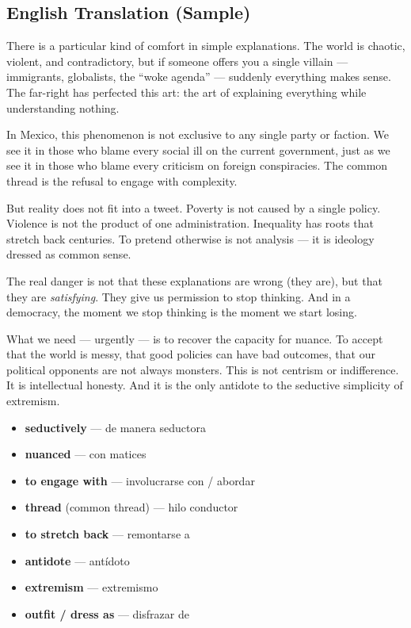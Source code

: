 \documentclass[11pt,a4paper]{article}
\begin{document}
\subsection{English Translation (Sample)}

\begin{tcolorbox}[colback=green!5!white, colframe=green!50!black, 
    title=\textbf{Translation: ``The Far-Right That Explains Everything 
    (Except Reality)''}]

There is a particular kind of comfort in simple explanations. The world is chaotic, 
violent, and contradictory, but if someone offers you a single villain --- 
immigrants, globalists, the ``woke agenda'' --- suddenly everything makes sense. 
The far-right has perfected this art: the art of explaining everything while 
understanding nothing.

In Mexico, this phenomenon is not exclusive to any single party or faction. 
We see it in those who blame every social ill on the current government, 
just as we see it in those who blame every criticism on foreign conspiracies. 
The common thread is the refusal to engage with complexity.

But reality does not fit into a tweet. Poverty is not caused by a single policy. 
Violence is not the product of one administration. Inequality has roots that stretch 
back centuries. To pretend otherwise is not analysis --- it is ideology dressed 
as common sense.

The real danger is not that these explanations are wrong (they are), but that 
they are \emph{satisfying}. They give us permission to stop thinking. And in a 
democracy, the moment we stop thinking is the moment we start losing.

What we need --- urgently --- is to recover the capacity for nuance. To accept 
that the world is messy, that good policies can have bad outcomes, that our 
political opponents are not always monsters. This is not centrism or indifference. 
It is intellectual honesty. And it is the only antidote to the seductive simplicity 
of extremism.
\end{tcolorbox}

\begin{tcolorbox}[colback=yellow!10!white, colframe=orange!70!black, 
    title=\textbf{Vocabulary Highlights for TOEFL}]
\begin{itemize}
    \item \textbf{seductively} --- de manera seductora
    \item \textbf{nuanced} --- con matices
    \item \textbf{to engage with} --- involucrarse con / abordar
    \item \textbf{thread} (common thread) --- hilo conductor
    \item \textbf{to stretch back} --- remontarse a
    \item \textbf{antidote} --- antídoto
    \item \textbf{extremism} --- extremismo
    \item \textbf{outfit / dress as} --- disfrazar de
\end{itemize}
\end{tcolorbox}
\end{document}
